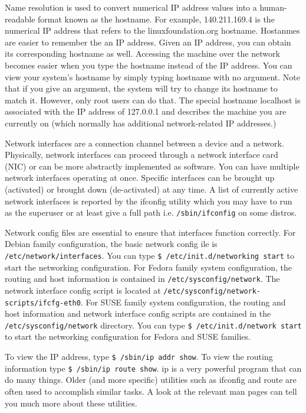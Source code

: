 Name resolution is used to convert numerical IP address values into a
human-readable format known as the hostname. For example, 140.211.169.4
is the numerical IP address that refers to the linuxfoundation.org
hostname. Hostanmes are easier to remember the an IP address. Given an
IP address, you can obtain its corresponding hostname as well. Accessing
the machine over the network becomes easier when you type the hostname
instead of the IP address. You can view your system's hostname by simply
typing hostname with no argument. Note that if you give an argument, the
system will try to change its hostname to match it. However, only root
users can do that. The special hostname localhost is associated with the
IP address of 127.0.0.1 and describes the machine you are currently on
(which normally has additional network-related IP addresses.)

Network interfaces are a connection channel between a device and a
network. Physically, network interfaces can proceed through a network
interface card (NIC) or can be more abstractly implemented as software.
You can have multiple network interfaces operating at once. Specific
interfaces can be brought up (activated) or brought down (de-activated)
at any time. A list of currently active network interfaces is reported
by the ifconfig utility which you may have to run as the superuser or at
least give a full path i.e. \texttt{/sbin/ifconfig} on some distros.

Network config files are essential to ensure that interfaces function
correctly. For Debian family configuration, the basic network config ile
is \texttt{/etc/network/interfaces}. You can type
\texttt{\$ /etc/init.d/networking start} to start the networking
configuration. For Fedora family system configuration, the routing and
host information is contained in \texttt{/etc/sysconfig/network}. The
network interface config script is located at
\texttt{/etc/sysconfig/network-scripts/ifcfg-eth0}. For SUSE family
system configuration, the routing and host information and network
interface config scripts are contained in the
\texttt{/etc/sysconfig/network} directory. You can type
\texttt{\$ /etc/init.d/network start} to start the networking
configuration for Fedora and SUSE families.

To view the IP address, type \texttt{\$ /sbin/ip addr show}. To view the
routing information type \texttt{\$ /sbin/ip route show}. ip is a very
powerful program that can do many things. Older (and more specific)
utilities such as ifconfig and route are often used to accomplish
similar tasks. A look at the relevant man pages can tell you much more
about these utilities.

